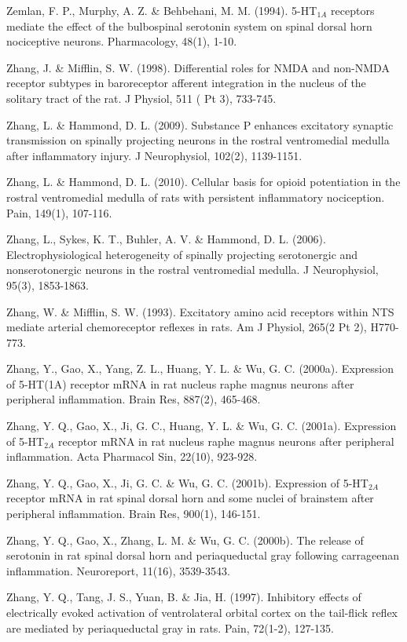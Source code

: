 \documentclass[a4paper,12pt,twoside]{report}
\begin{document}
\begin{singlespacing}
\begin{footnotesize}
Zemlan, F. P., Murphy, A. Z. \& Behbehani, M. M. (1994). 5-HT$_{1A}$ receptors mediate the effect of the bulbospinal serotonin system on spinal dorsal horn nociceptive neurons. Pharmacology, 48(1), 1-10.

Zhang, J. \& Mifflin, S. W. (1998). Differential roles for NMDA and non-NMDA receptor subtypes in baroreceptor afferent integration in the nucleus of the solitary tract of the rat. J Physiol, 511 ( Pt 3), 733-745.

Zhang, L. \& Hammond, D. L. (2009). Substance P enhances excitatory synaptic transmission on spinally projecting neurons in the rostral ventromedial medulla after inflammatory injury. J Neurophysiol, 102(2), 1139-1151.

Zhang, L. \& Hammond, D. L. (2010). Cellular basis for opioid potentiation in the rostral ventromedial medulla of rats with persistent inflammatory nociception. Pain, 149(1), 107-116.

Zhang, L., Sykes, K. T., Buhler, A. V. \& Hammond, D. L. (2006). Electrophysiological heterogeneity of spinally projecting serotonergic and nonserotonergic neurons in the rostral ventromedial medulla. J Neurophysiol, 95(3), 1853-1863.

Zhang, W. \& Mifflin, S. W. (1993). Excitatory amino acid receptors within NTS mediate arterial chemoreceptor reflexes in rats. Am J Physiol, 265(2 Pt 2), H770-773.

Zhang, Y., Gao, X., Yang, Z. L., Huang, Y. L. \& Wu, G. C. (2000a). Expression of 5-HT(1A) receptor mRNA in rat nucleus raphe magnus neurons after peripheral inflammation. Brain Res, 887(2), 465-468.

Zhang, Y. Q., Gao, X., Ji, G. C., Huang, Y. L. \& Wu, G. C. (2001a). Expression of 5-HT$_{2A}$ receptor mRNA in rat nucleus raphe magnus neurons after peripheral inflammation. Acta Pharmacol Sin, 22(10), 923-928.

Zhang, Y. Q., Gao, X., Ji, G. C. \& Wu, G. C. (2001b). Expression of 5-HT$_{2A}$ receptor mRNA in rat spinal dorsal horn and some nuclei of brainstem after peripheral inflammation. Brain Res, 900(1), 146-151.

Zhang, Y. Q., Gao, X., Zhang, L. M. \& Wu, G. C. (2000b). The release of serotonin in rat spinal dorsal horn and periaqueductal gray following carrageenan inflammation. Neuroreport, 11(16), 3539-3543.

Zhang, Y. Q., Tang, J. S., Yuan, B. \& Jia, H. (1997). Inhibitory effects of electrically evoked activation of ventrolateral orbital cortex on the tail-flick reflex are mediated by periaqueductal gray in rats. Pain, 72(1-2), 127-135.


\end{footnotesize}
\end{singlespacing}
\end{document}
